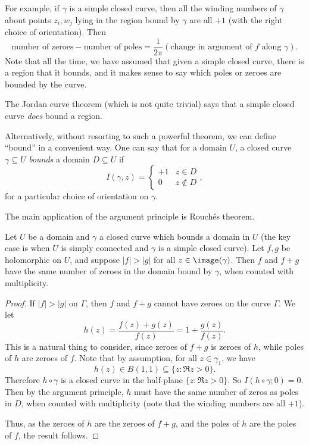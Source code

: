 \documentclass[a4paper]{article}
\begin{document}
For example, if $\gamma$ is a simple closed curve, then all the winding numbers of $\gamma$ about points $z_i, w_j$ lying in the region bound by $\gamma$ are all $+1$ (with the right choice of orientation). Then
\[
  \text{number of zeroes} - \text{number of poles} = \frac{1}{2\pi} (\text{change in argument of $f$ along $\gamma$}).
\]
Note that all the time, we have assumed that given a simple closed curve, there is a region that it bounds, and it makes sense to say which poles or zeroes are bounded by the curve.

The Jordan curve theorem (which is not quite trivial) says that a simple closed curve \emph{does} bound a region.

Alternatively, without resorting to such a powerful theorem, we can define ``bound'' in a convenient way. One can say that for a domain $U$, a closed curve $\gamma \subseteq U$ \emph{bounds} a domain $D \subseteq U$ if
\[
  I(\gamma, z) =
  \begin{cases}
    +1 & z \in D\\
    0 & z \not\in D
  \end{cases},
\]
for a particular choice of orientation on $\gamma$.

The main application of the argument principle is Rouch\'es theorem.
\begin{cor}
  Let $U$ be a domain and $\gamma$ a closed curve which bounds a domain in $U$ (the key case is when $U$ is simply connected and $\gamma$ is a simple closed curve). Let $f, g$ be holomorphic on $U$, and suppose $|f| > |g|$ for all $z \in \image(\gamma)$. Then $f$ and $f + g$ have the same number of zeroes in the domain bound by $\gamma$, when counted with multiplicity.
\end{cor}

\begin{proof}
  If $|f| > |g|$ on $\Gamma$, then $f$ and $f + g$ cannot have zeroes on the curve $\Gamma$. We let
  \[
    h(z) = \frac{f(z) + g(z)}{f(z)} = 1 + \frac{g(z)}{f(z)}.
  \]
  This is a natural thing to consider, since zeroes of $f + g$ is zeroes of $h$, while poles of $h$ are zeroes of $f$. Note that by assumption, for all $z \in \gamma_1$, we have
  \[
    h(z) \in B(1, 1) \subseteq \{z: \Re z > 0\}.
  \]
  Therefore $h \circ \gamma$ is a closed curve in the half-plane $\{z: \Re z > 0\}$. So $I(h \circ \gamma; 0) = 0$. Then by the argument principle, $h$ must have the same number of zeros as poles in $D$, when counted with multiplicity (note that the winding numbers are all $+1$).

  Thus, as the zeroes of $h$ are the zeroes of $f + g$, and the poles of $h$ are the poles of $f$, the result follows.
\end{proof}
\end{document}
